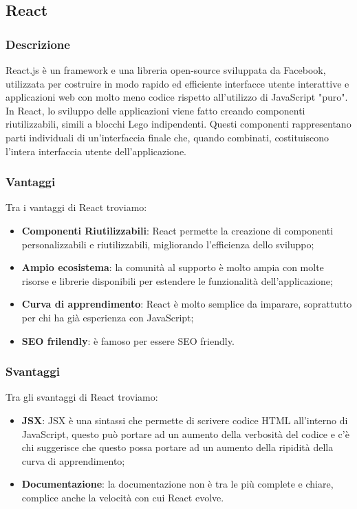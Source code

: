 \subsection*{React}

\subsubsection*{Descrizione}
React.js è un framework e una libreria open-source sviluppata da Facebook, utilizzata per costruire in modo rapido ed efficiente interfacce utente interattive e applicazioni web con molto meno codice rispetto all'utilizzo di JavaScript "puro".\\

In React, lo sviluppo delle applicazioni viene fatto creando componenti riutilizzabili, simili a blocchi Lego indipendenti. Questi componenti rappresentano parti individuali di un'interfaccia finale che, quando combinati, costituiscono l'intera interfaccia utente dell'applicazione.
\subsubsection*{Vantaggi}
Tra i vantaggi di React troviamo:
\begin{itemize}
    \item \textbf{Componenti Riutilizzabili}: React permette la creazione di componenti personalizzabili e riutilizzabili, migliorando l'efficienza dello sviluppo;
    \item \textbf{Ampio ecosistema}: la comunità al supporto è molto ampia con molte risorse e librerie disponibili per estendere le funzionalità dell'applicazione;
    \item \textbf{Curva di apprendimento}: React è molto semplice da imparare, soprattutto per chi ha già esperienza con JavaScript;
    \item \textbf{SEO frilendly}: è famoso per essere SEO friendly.
\end{itemize}

\subsubsection*{Svantaggi}
Tra gli svantaggi di React troviamo:
\begin{itemize}
    \item \textbf{JSX}: JSX è una sintassi che permette di scrivere codice HTML all'interno di JavaScript, questo può portare ad un aumento della verbosità del codice e c'è chi suggerisce che questo possa portare ad un aumento della ripidità della curva di apprendimento;
    \item \textbf{Documentazione}: la documentazione non è tra le più complete e chiare, complice anche la velocità con cui React evolve.

\end{itemize}


